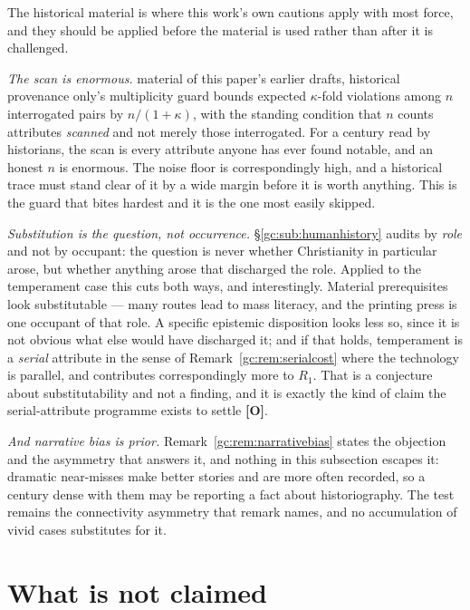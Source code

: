 \begin{remark}
\label{gc:rem:historyguards}
The historical material is where this work's own cautions apply with
most force, and they should be applied before the material is used
rather than after it is challenged.

\emph{The scan is enormous.} material of this paper's earlier drafts, historical provenance only's multiplicity
guard bounds expected $\kappa$-fold violations among $n$ interrogated
pairs by $n/(1+\kappa)$, with the standing condition that $n$ counts
attributes \emph{scanned} and not merely those interrogated. For a
century read by historians, the scan is every attribute anyone has ever
found notable, and an honest $n$ is enormous. The noise floor is
correspondingly high, and a historical trace must stand clear of it by a
wide margin before it is worth anything. This is the guard that bites
hardest and it is the one most easily skipped.

\emph{Substitution is the question, not occurrence.}
\S\ref{gc:sub:humanhistory} audits by \emph{role} and not by occupant:
the question is never whether Christianity in particular arose, but
whether anything arose that discharged the role. Applied to the
temperament case this cuts both ways, and interestingly. Material
prerequisites look substitutable --- many routes lead to mass literacy,
and the printing press is one occupant of that role. A specific epistemic
disposition looks less so, since it is not obvious what else would have
discharged it; and if that holds, temperament is a \emph{serial}
attribute in the sense of Remark~\ref{gc:rem:serialcost} where the technology
is parallel, and contributes correspondingly more to $R_1$. That is a
conjecture about substitutability and not a finding, and it is exactly
the kind of claim the serial-attribute programme exists to settle
\textbf{[O]}.

\emph{And narrative bias is prior.} Remark~\ref{gc:rem:narrativebias}
states the objection and the asymmetry that answers it, and nothing in
this subsection escapes it: dramatic near-misses make better stories and
are more often recorded, so a century dense with them may be reporting a
fact about historiography. The test remains the connectivity asymmetry
that remark names, and no accumulation of vivid cases substitutes for it.
\end{remark}


\section{What is not claimed}\label{sec:fences}

